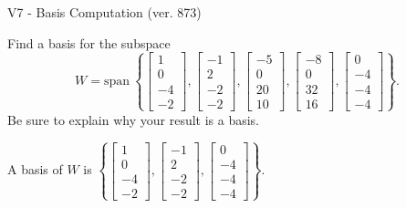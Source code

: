 \begin{exercise}
  \begin{exerciseTitle}V7 - Basis Computation (ver. 873)\end{exerciseTitle}
  \begin{exerciseStatement}
    Find a basis for the subspace 
\[W=\mathrm{span}\ \left\{\left[\begin{array}{r}
1 \\
0 \\
-4 \\
-2
\end{array}\right] , \left[\begin{array}{r}
-1 \\
2 \\
-2 \\
-2
\end{array}\right] , \left[\begin{array}{r}
-5 \\
0 \\
20 \\
10
\end{array}\right] , \left[\begin{array}{r}
-8 \\
0 \\
32 \\
16
\end{array}\right] , \left[\begin{array}{r}
0 \\
-4 \\
-4 \\
-4
\end{array}\right]\right\}.\]
 Be sure to explain why your result is a basis.


  \end{exerciseStatement}
  \begin{exerciseAnswer}
   A basis of \(W\) is  \(\left\{\left[\begin{array}{r}
1 \\
0 \\
-4 \\
-2
\end{array}\right] , \left[\begin{array}{r}
-1 \\
2 \\
-2 \\
-2
\end{array}\right] , \left[\begin{array}{r}
0 \\
-4 \\
-4 \\
-4
\end{array}\right]\right\}\).
  


  \end{exerciseAnswer}
\end{exercise}